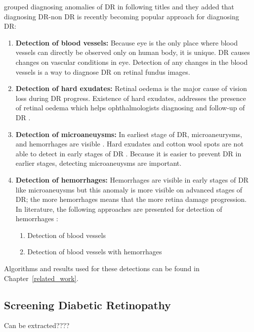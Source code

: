 \citet{rocha2011points} grouped diagnosing anomalies of DR in following titles and they added that diagnosing DR-non DR is recently becoming popular approach for diagnosing DR:  
\begin{enumerate}
    \item \textbf{Detection of blood vessels:}  Because eye is the only place where blood vessels can directly be observed only on human body, it is unique. DR causes changes on vascular conditions in eye. Detection of any changes in the blood vessels is a way to diagnose DR on retinal fundus images. \citet{mendonca2006segmentation}
    \item \textbf{Detection of hard exudates:} Retinal oedema is the major cause of vision loss during DR progress. Existence of hard exudates, addresses the presence of retinal oedema \citep{singer1992screening} which helps ophthalmologists diagnosing and follow-up of DR \citep{garcia2009neural}.
    \item \textbf{Detection of microaneuysms:} In earliest stage of DR, microaneurysms, and hemorrhages are visible \citep{doi:10.1056/NEJMra021678}. Hard exudates and cotton wool spots are not able to detect in early stages of DR \citep{navarro2016automatic}. Because it is easier to prevent DR in earlier stages, detecting microaneuysms are important.
    \item \textbf{Detection of hemorrhages:} Hemorrhages are visible in early stages of DR like microaneuysms but this anomaly is more visible on advanced stages of DR; the more hemorrhages means that the more retina damage progression. In literature, the following approaches are presented for detection of hemorrhages \citep{rocha2011points}:
    \begin{enumerate}
        \item Detection of blood vessels
        \item Detection of blood vessels with hemorrhages
    \end{enumerate}
\end{enumerate}

Algorithms and results used for these detections can be found in Chapter~\ref{related_work}.




\subsection{Screening Diabetic Retinopathy}

Can be extracted???? 


